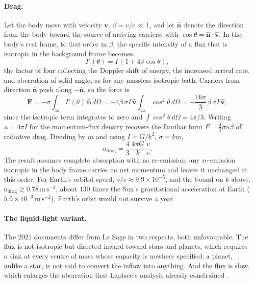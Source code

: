 \documentclass[11pt]{article}
\begin{document}
\paragraph{Drag.} Let the body move with velocity $\mathbf v$, $\beta = v/c \ll 1$, and let $\hat{\mathbf n}$ denote the direction from the body toward the source of arriving carriers, with $\cos\theta = \hat{\mathbf n}\cdot\hat{\mathbf v}$. In the body's rest frame, to first order in $\beta$, the specific intensity of a flux that is isotropic in the background frame becomes
\begin{equation}
I'(\theta) = I\,(1 + 4\beta\cos\theta),
\end{equation}
the factor of four collecting the Doppler shift of energy, the increased arrival rate, and aberration of solid angle, as for any massless isotropic bath. Carriers from direction $\hat{\mathbf n}$ push along $-\hat{\mathbf n}$, so the force is
\begin{equation}
\mathbf F = -\sigma\int_{4\pi} I'(\theta)\,\hat{\mathbf n}\,d\Omega
= -4\beta\,\sigma I\,\hat{\mathbf v}\int_{4\pi}\cos^2\theta\,d\Omega
= -\frac{16\pi}{3}\,\beta\,\sigma I\,\hat{\mathbf v},
\end{equation}
since the isotropic term integrates to zero and $\int\cos^2\theta\,d\Omega = 4\pi/3$. Writing $u = 4\pi I$ for the momentum-flux density recovers the familiar form $F = \tfrac43\sigma u\beta$ of radiative drag. Dividing by $m$ and using $I = G/k^2$, $\sigma = km$,
\begin{equation}
a_{\mathrm{drag}} = \frac{4}{3}\,\frac{4\pi G}{k}\,\frac{v}{c}.
\end{equation}
The result assumes complete absorption with no re-emission; any re-emission isotropic in the body frame carries no net momentum and leaves it unchanged at this order. For Earth's orbital speed, $v/c \approx 9.9\times10^{-5}$, and the bound on $k$ above, $a_{\mathrm{drag}} \gtrsim 0.78\,\mathrm{m\,s^{-2}}$, about $130$ times the Sun's gravitational acceleration at Earth ($5.9\times10^{-3}\,\mathrm{m\,s^{-2}}$). Earth's orbit would not survive a year.

\paragraph{The liquid-light variant.} The 2021 documents differ from Le Sage in two respects, both unfavourable. The flux is not isotropic but directed inward toward stars and planets, which requires a sink at every centre of mass whose capacity is nowhere specified; a planet, unlike a star, is not said to convert the inflow into anything. And the flux is slow, which enlarges the aberration that Laplace's analysis already constrained \cite{laplace1805}.
\end{document}
